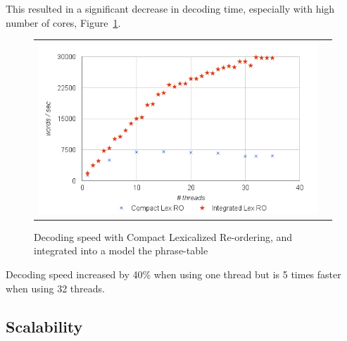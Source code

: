 \documentclass[]{article}
\begin{document}
This resulted in a significant decrease in decoding time, especially with high number of cores, Figure~\ref{fig:lex-ro}. 
\begin{figure}[h]
\centering
\begin{tabular}{cc}
{\includegraphics[scale=0.4]{lex-ro.png}} 
\end{tabular}
\caption{Decoding speed with Compact Lexicalized Re-ordering, and integrated into a model the phrase-table}
\label{fig:lex-ro}
\end{figure} 
Decoding speed increased by 40\% when using one thread but is 5 times faster when using 32 threads. %

\subsection{Scalability}
\end{document}
